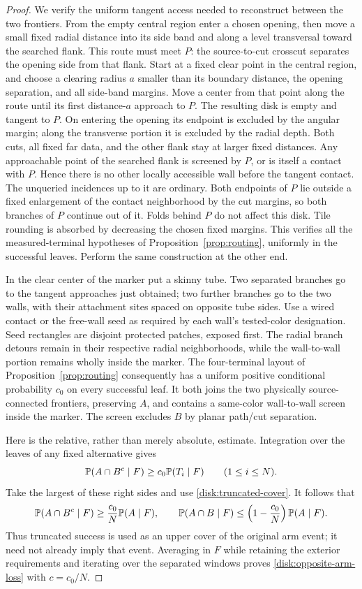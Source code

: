 \begin{proof}
We verify the uniform tangent access needed to reconstruct between
the two frontiers. From the empty central region enter a chosen
opening, then move a small fixed radial distance into its side
band and along a level transversal toward the searched flank.
This route must meet $P$: the source-to-cut crosscut separates the
opening side from that flank. Start at a fixed clear point in the
central region, and choose a clearing radius $a$ smaller than its
boundary distance, the opening separation, and all side-band margins.
Move a center from that point along the route until its first distance-$a$
approach to $P$. The resulting disk is empty and tangent to $P$.
On entering the opening its endpoint is excluded by the angular
margin; along the transverse portion it is excluded by the radial
depth. Both cuts, all fixed far data, and the other flank stay at
larger fixed distances. Any approachable point of the searched
flank is screened by $P$, or is itself a contact with $P$. Hence
there is no other locally accessible wall before the tangent
contact. The unqueried incidences up to it are ordinary. Both endpoints
of $P$ lie outside a fixed enlargement of the contact neighborhood by
the cut margins, so both branches of $P$ continue out of it. Folds behind $P$
do not affect this disk. Tile rounding is absorbed by decreasing
the chosen fixed margins. This verifies all the measured-terminal
hypotheses of Proposition~\ref{prop:routing}, uniformly in the
successful leaves. Perform the same construction at the other end.

In the clear center of the marker put a skinny tube. Two separated
branches go to the tangent approaches just obtained; two further
branches go to the two walls, with their attachment sites spaced
on opposite tube sides. Use a wired contact or the free-wall seed
as required by each wall's tested-color designation. Seed
rectangles are disjoint protected patches, exposed first. The
radial branch detours remain in their respective radial
neighborhoods, while the wall-to-wall portion remains wholly
inside the marker. The four-terminal layout of
Proposition~\ref{prop:routing} consequently has a uniform positive
conditional probability $c_0$ on every successful leaf. It both
joins the two physically source-connected frontiers, preserving
$A$, and contains a same-color wall-to-wall screen inside the
marker. The screen excludes $B$ by planar path/cut separation.

Here is the relative, rather than merely absolute, estimate.
Integration over the leaves of any fixed alternative gives
\begin{equation}\label{disk:relative-reconstruction}
 \mathbb P(A\cap B^c\mid F)\ge c_0\mathbb P(T_i\mid F)
       \qquad(1\le i\le N).
\end{equation}
Take the largest of these right sides and use
\eqref{disk:truncated-cover}. It follows that
\[
 \mathbb P(A\cap B^c\mid F)
       \ge\frac{c_0}{N}\mathbb P(A\mid F),\qquad
 \mathbb P(A\cap B\mid F)
       \le\left(1-\frac{c_0}{N}\right)\mathbb P(A\mid F).
\]
Thus truncated success is used as an upper cover of the original
arm event; it need not already imply that event. Averaging in $F$
while retaining the exterior requirements and iterating over the
separated windows proves \eqref{disk:opposite-arm-loss} with
$c=c_0/N$.


\end{proof}
